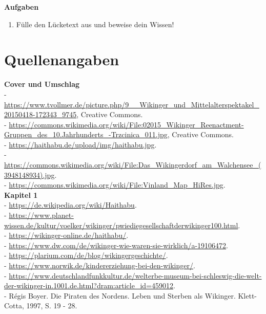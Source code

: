 \documentclass[12pt,a4paper,ngerman,openany]{book}
\newcommand\blankpage{\null \thispagestyle{empty} \addtocounter{page}{-1} \newpage}
\newcommand{\aufgaben}[1]{
  \begin{tcolorbox}
    \textbf{Aufgaben}
    \begin{enumerate}
      #1
    \end{enumerate}
  \end{tcolorbox}
} %
\begin{document}
\aufgaben{
  \item Fülle den Lücketext aus und beweise dein Wissen!
}

\afterpage{\blankpage}

\newpage %
\section{Quellenangaben}

\textbf{Cover und Umschlag}\\
- \url{https://www.tvollmer.de/picture.php/9__Wikinger_und_Mittelalterspektakel_20150418-172343_9745}, Creative Commons.\\
- \url{https://commons.wikimedia.org/wiki/File:02015_Wikinger_Reenactment-Gruppen_des_10.Jahrhunderts_-Trzcinica_011.jpg}, Creative Commons.\\
- \url{https://haithabu.de/upload/img/haithabu.jpg}.\\
- \url{https://commons.wikimedia.org/wiki/File:Das_Wikingerdorf_am_Walchensee_(3948148934).jpg}.\\
- \url{https://commons.wikimedia.org/wiki/File:Vinland_Map_HiRes.jpg}.\\


\textbf{Kapitel 1}\\
- \url{https://de.wikipedia.org/wiki/Haithabu}.\\
- \url{https://www.planet-wissen.de/kultur/voelker/wikinger/pwiediegesellschaftderwikinger100.html}.\\
- \url{https://wikinger-online.de/haithabu/}.\\
- \url{https://www.dw.com/de/wikinger-wie-waren-sie-wirklich/a-19106472}.\\
- \url{https://plarium.com/de/blog/wikingergeschichte/}.\\
- \url{https://www.norwik.de/kindererziehung-bei-den-wikinger/}.\\
- \url{https://www.deutschlandfunkkultur.de/welterbe-museum-bei-schleswig-die-welt-der-wikinger-in.1001.de.html?dram:article_id=459012}.\\
- Régis Boyer. Die Piraten des Nordens. Leben und Sterben als Wikinger. Klett-Cotta, 1997, S. 19 - 28.\\
\end{document}
